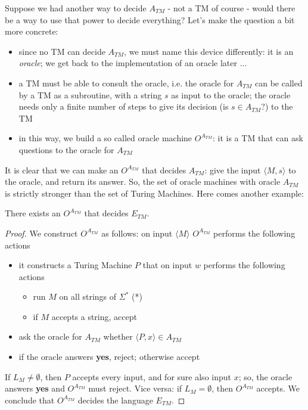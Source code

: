 Suppose we had another way to decide $A_{TM}$ - not a TM of course -
would there be a way to use that power to decide everything? Let's
make the question a bit more concrete:
\begin{itemize}
\item since no TM can decide $A_{TM}$, we must name this device
  differently: it is an {\em oracle}; we get back to the
  implementation of an oracle later ...

\item a TM must be able to consult the oracle, i.e. the oracle for
  $A_{TM}$ can be called by a TM as a subroutine, with a string $s$ as
  input to the oracle; the oracle needs only a finite number of steps
  to give its decision (is $s \in A_{TM}$?) to the TM

\item in this way, we build a so called oracle machine $O^{A_{TM}}$:
  it is a TM that can ask questions to the oracle for $A_{TM}$
\end{itemize}

It is clear that we can make an $O^{A_{TM}}$ that decides $A_{TM}$:
give the input $\langle M,s \rangle$ to the oracle, and return its
answer. So, the set of oracle machines with oracle $A_{TM}$ is
strictly stronger than the set of Turing Machines. Here comes another
example:

\begin{theorem}
There exists an $O^{A_{TM}}$ that decides $E_{TM}$.
\end{theorem}
\begin{proof}
We construct $O^{A_{TM}}$ as follows: on input $\langle M \rangle$
$O^{A_{TM}}$ performs the following actions
\begin{itemize}
\item
it constructs a Turing Machine $P$ that on input $w$ performs the
following actions
\begin{itemize}
\item run $M$ on all strings of $\Sigma^*$ (*)\label{allestrings}
\item if $M$ accepts a string, accept
\end{itemize}

\item ask the oracle for $A_{TM}$ whether $\langle P,x \rangle \in
  A_{TM}$

\item if the oracle answers {\bf yes}, reject; otherwise accept
\end{itemize}
If $L_M \neq \emptyset$, then $P$ accepts every input, and for sure
also input $x$; so, the oracle answers {\bf yes} and $O^{A_{TM}}$ must
reject. Vice versa: if $L_M = \emptyset$, then $O^{A_{TM}}$
accepts. We conclude that $O^{A_{TM}}$ decides the language $E_{TM}$.
\end{proof}

